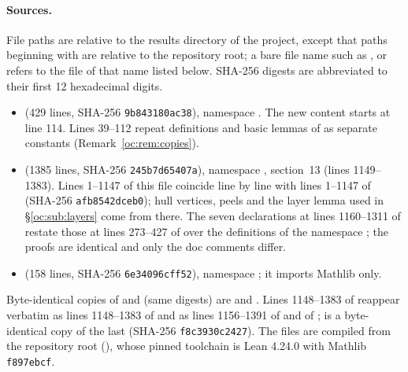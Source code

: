 \paragraph{Sources.} File paths are relative to the results directory of the project, except that paths
beginning with  are relative to the repository root; a bare file name such as
,  or  refers to the file of that
name listed below. SHA-256 digests are abbreviated to their first 12 hexadecimal digits.
\begin{itemize}
\item {} (429 lines, SHA-256 \texttt{9b843180ac38}), namespace
  . The new content starts at line 114. Lines 39--112 repeat
  definitions and basic lemmas of  as separate constants
  (Remark~\ref{oc:rem:copies}).
\item {} (1385 lines, SHA-256 \texttt{245b7d65407a}), namespace
  , section~13 (lines 1149--1383). Lines 1--1147 of this file coincide
  line by line with lines 1--1147 of  (SHA-256 \texttt{afb8542dceb0});
  hull vertices, peels and the layer lemma used in \S\ref{oc:sub:layers} come from there. The seven
  declarations at lines 1160--1311 of  restate those at lines 273--427 of
   over the definitions of the namespace ;
  the proofs are identical and only the doc comments differ.
\item {} (158 lines, SHA-256 \texttt{6e34096cff52}), namespace
  ; it imports Mathlib only.
\end{itemize}
Byte-identical copies of  and  (same digests) are
 and . Lines
1148--1383 of  reappear verbatim as lines 1148--1383 of
 and as lines 1156--1391 of  and
of ;  is a byte-identical
copy of the last (SHA-256 \texttt{f8c3930c2427}). The files are compiled from the repository root
(), whose pinned toolchain is Lean 4.24.0 with Mathlib \texttt{f897ebcf}.

